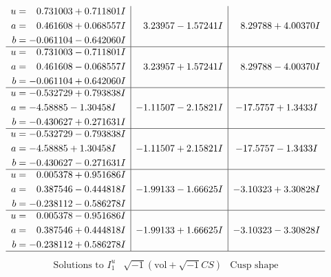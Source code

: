 \documentclass[1p]{elsarticle_modified}
\theoremstyle{definition}
\newcommand{\I}{\sqrt{-1}}
\begin{document}
$$\begin{array}{c|c|c}
\begin{aligned}
u &= \phantom{-}0.731003 + 0.711801 I \\
a &= \phantom{-}0.461608 + 0.068557 I \\
b &= -0.061104 - 0.642060 I\end{aligned}
 & \phantom{-}3.23957 - 1.57241 I & \phantom{-}8.29788 + 4.00370 I \\ \hline\begin{aligned}
u &= \phantom{-}0.731003 - 0.711801 I \\
a &= \phantom{-}0.461608 - 0.068557 I \\
b &= -0.061104 + 0.642060 I\end{aligned}
 & \phantom{-}3.23957 + 1.57241 I & \phantom{-}8.29788 - 4.00370 I \\ \hline\begin{aligned}
u &= -0.532729 + 0.793838 I \\
a &= -4.58885 - 1.30458 I \\
b &= -0.430627 + 0.271631 I\end{aligned}
 & -1.11507 - 2.15821 I & -17.5757 + 1.3433 I \\ \hline\begin{aligned}
u &= -0.532729 - 0.793838 I \\
a &= -4.58885 + 1.30458 I \\
b &= -0.430627 - 0.271631 I\end{aligned}
 & -1.11507 + 2.15821 I & -17.5757 - 1.3433 I \\ \hline\begin{aligned}
u &= \phantom{-}0.005378 + 0.951686 I \\
a &= \phantom{-}0.387546 - 0.444818 I \\
b &= -0.238112 - 0.586278 I\end{aligned}
 & -1.99133 - 1.66625 I & -3.10323 + 3.30828 I \\ \hline\begin{aligned}
u &= \phantom{-}0.005378 - 0.951686 I \\
a &= \phantom{-}0.387546 + 0.444818 I \\
b &= -0.238112 + 0.586278 I\end{aligned}
 & -1.99133 + 1.66625 I & -3.10323 - 3.30828 I\\
 \hline 
 \end{array}$$\newpage$$\begin{array}{c|c|c}  
\text{Solutions to }I^u_{1}& \I (\text{vol} + \sqrt{-1}CS) & \text{Cusp shape}\\
 \hline 
\begin{aligned}

\end{aligned}
\end{array}$$
\end{document}
